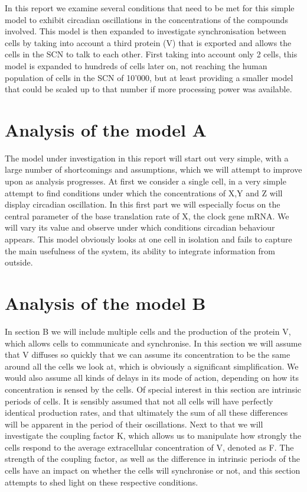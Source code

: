     In this report we examine several conditions that need to be met for this simple model to exhibit circadian oscillations in the concentrations of the compounds involved. This model is then expanded to investigate synchronisation between cells by taking into account a third protein (V) that is exported and allows the cells in the SCN to talk to each other. First taking into account only 2 cells, this model is expanded to hundreds of cells later on, not reaching the human population of cells in the SCN of 10'000, but at least providing a smaller model that could be scaled up to that number if more processing power was available. \par
    
    \section{Analysis of the model A}
    The model under investigation in this report will start out very simple, with a large number of shortcomings and assumptions, which we will attempt to improve upon as analysis progresses. At first we consider a single cell, in a very simple attempt to find conditions under which the concentrations of X,Y and Z will display circadian oscillation. In this first part we will especially focus on the central parameter of the base translation rate of X, the clock gene mRNA. We will vary its value and observe under which conditions circadian behaviour appears. This model obviously looks at one cell in isolation and fails to capture the main usefulness of the system, its ability to integrate information from outside. \par
    
    \section{Analysis of the model B}
    In section B we will include multiple cells and the production of the protein V, which allows cells to communicate and synchronise. In this section we will assume that V diffuses so quickly that we can assume its concentration to be the same around all the cells we look at, which is obviously a significant simplification. We would also assume all kinds of delays in its mode of action, depending on how its concentration is sensed by the cells. Of special interest in this section are intrinsic periods of cells. It is sensibly assumed that not all cells will have perfectly identical production rates, and that ultimately the sum of all these differences will be apparent in the period of their oscillations. Next to that we will investigate the coupling factor K, which allows us to manipulate how strongly the cells respond to the average extracellular concentration of V, denoted as F. The strength of the coupling factor, as well as the difference in intrinsic periods of the cells have an impact on whether the cells will synchronise or not, and this section attempts to shed light on these respective conditions. 
    
    
    